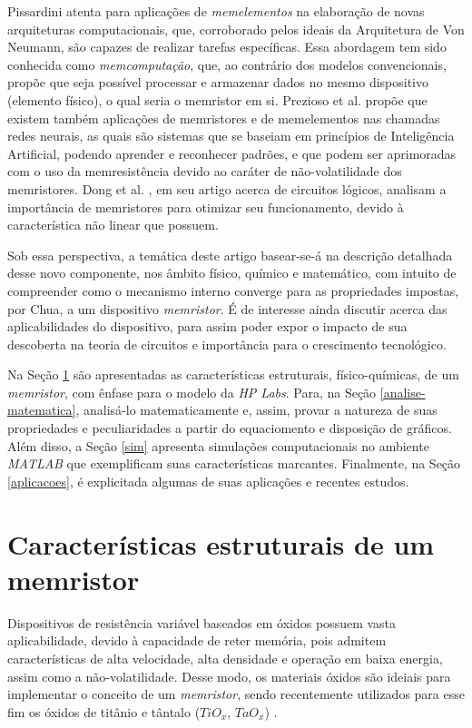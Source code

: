\documentclass{ceel}
\begin{document}
\begin{multicols}{2}
Pissardini \cite{memcomputacao} atenta para aplicações de \emph{memelementos} na elaboração de novas arquiteturas computacionais, que, corroborado pelos ideais da Arquitetura de Von Neumann, são capazes de realizar tarefas específicas. Essa abordagem tem sido conhecida como \emph{memcomputação}, que, ao contrário dos modelos convencionais, propõe que seja possível processar e armazenar dados no mesmo dispositivo (elemento físico), o qual seria o memristor em si. Prezioso et al. \cite{rneurais} propõe que existem também aplicações de memristores e de memelementos nas chamadas redes neurais, as quais são sistemas que se baseiam em princípios de Inteligência Artificial, podendo aprender e reconhecer padrões, e que podem ser aprimoradas com o uso da memresistência devido ao caráter de não-volatilidade dos memristores. Dong et al. \cite{chines}, em seu artigo acerca de circuitos lógicos, analisam a importância de memristores para otimizar
seu funcionamento, devido à característica não linear que possuem.

Sob essa perspectiva, a temática deste artigo basear-se-á na descrição detalhada desse novo componente, nos âmbito físico, químico e matemático, com intuito de compreender como o mecanismo interno converge para as propriedades impostas,  por Chua, a um dispositivo \emph{memristor}. É de interesse ainda discutir acerca das aplicabilidades do dispositivo, para assim poder expor o impacto de sua descoberta na teoria de circuitos e importância para o crescimento tecnológico. %

Na Seção \ref{estrutura} são apresentadas as características estruturais, físico-químicas, de um \emph{memristor}, com ênfase para o modelo da \emph{HP Labs}. Para, na Seção \ref{analise-matematica}, analisá-lo matematicamente e, assim, provar a natureza de suas propriedades e peculiaridades a partir do equaciomento e disposição de gráficos. Além disso, a Seção \ref{sim} apresenta simulações computacionais no ambiente \emph{MATLAB}
que exemplificam suas características marcantes. Finalmente, na Seção \ref{aplicacoes}, é explicitada algumas de suas aplicações e recentes estudos.


\section{Características estruturais de um memristor} \label{estrutura}
Dispositivos de resistência variável baseados em óxidos 
possuem vasta aplicabilidade, devido à capacidade de reter memória, pois
admitem características de alta velocidade, alta densidade e operação em baixa energia, 
assim como a não-volatilidade. Desse modo, os materiais óxidos são ideiais para implementar o conceito de um \emph{memristor}, sendo recentemente utilizados para esse fim os óxidos de titânio e tântalo ($TiO_x$, $TaO_x$) \cite{conceito}. %


\end{multicols}
\end{document}
